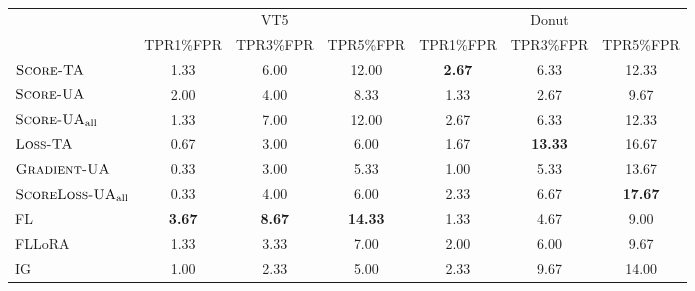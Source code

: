 \begin{table}[t]
\begin{center}
\begin{small}
\begin{adjustbox}{width=1\textwidth}
\small
\begin{tabular}{lcccccc}
\toprule
 & \multicolumn{3}{c}{VT5} & \multicolumn{3}{c}{Donut} \\
\cmidrule(l){2-4}
\cmidrule(l){5-7}
 & TPR1\%FPR & TPR3\%FPR & TPR5\%FPR & TPR1\%FPR & TPR3\%FPR & TPR5\%FPR \\
\midrule
$\textsc{Score-TA}$ & 1.33 & 6.00 & 12.00 & \textbf{2.67} & 6.33 & 12.33\\
$\textsc{Score-UA}$ & 2.00 & 4.00 & 8.33 & 1.33 & 2.67 & 9.67 \\
$\textsc{Score-UA}_{\text{all}}$ & 1.33 & 7.00 & 12.00 & 2.67 & 6.33 & 12.33 \\
\midrule
$\textsc{Loss-TA}$ & 0.67 & 3.00 & 6.00 & 1.67 & \textbf{13.33} & 16.67 \\
$\textsc{Gradient-UA}$ & 0.33 & 3.00 & 5.33 & 1.00 & 5.33 & 13.67 \\
$\textsc{ScoreLoss-UA}_{\text{all}}$ & 0.33 & 4.00 & 6.00 & 2.33 & 6.67 & \textbf{17.67} \\
\midrule
FL & \textbf{3.67} & \textbf{8.67} & \textbf{14.33} & 1.33 & 4.67 & 9.00 \\
FLLoRA & 1.33 & 3.33 & 7.00 & 2.00 & 6.00 & 9.67 \\
IG & 1.00 & 2.33 & 5.00 & 2.33 & 9.67 & 14.00 \\
\bottomrule
\end{tabular}
\end{adjustbox}
\end{small}
\end{center}
\vskip -0.1in
\caption{}
\label{tab:tpr@fpr_pfl}
\end{table}
